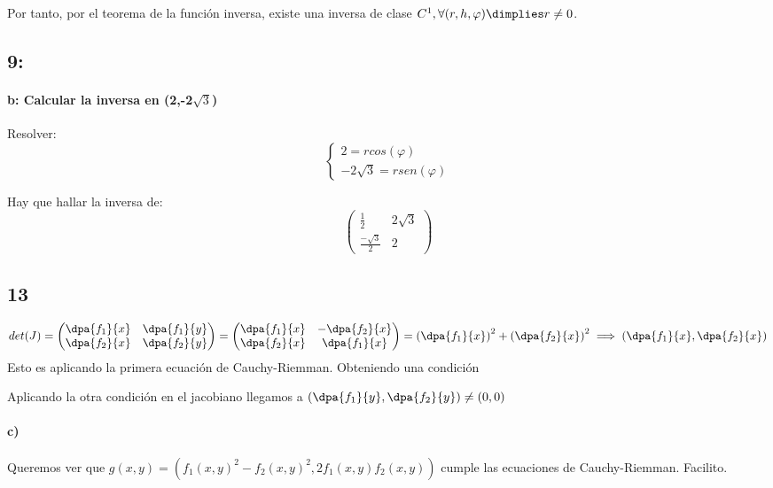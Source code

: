 \documentclass{apuntes}
\begin{document}
      Por tanto, por el teorema de la función inversa, existe una inversa de clase $C^1, \forall (r,h,\varphi) \dimplies r\neq 0$.

 \subsection{9:}
 
 \paragraph{b: Calcular la inversa en (2,-2$\sqrt{3}$)}
 
 Resolver: $$\left\{\begin{matrix} 2 = rcos(\varphi)\\-2\sqrt{3} = rsen(\varphi)\end{matrix}\right.$$
 
 Hay que hallar la inversa de: $$\begin{pmatrix}
                                  \frac{1}{2}&2\sqrt{3}\\
                                  \frac{-\sqrt{3}}{2}&2
                                 \end{pmatrix}$$

                                 
  \subsection{13}
  
  $$det(J) = \begin{pmatrix}
              \dpa{f_1}{x}&\dpa{f_1}{y}\\
              \dpa{f_2}{x}&\dpa{f_2}{y}
             \end{pmatrix} = 
             \begin{pmatrix}
              \dpa{f_1}{x}&-\dpa{f_2}{x}\\
              \dpa{f_2}{x}& \dpa{f_1}{x}
             \end{pmatrix}
	    = \left(\dpa{f_1}{x}\right)^2 + \left(\dpa{f_2}{x}\right)^2 \implies \left(\dpa{f_1}{x},\dpa{f_2}{x}\right)$$
Esto es aplicando la primera ecuación de Cauchy-Riemman. Obteniendo una condición

Aplicando la otra condición en el jacobiano llegamos a $\displaystyle\left(\dpa{f_1}{y},\dpa{f_2}{y}\right)\neq (0,0)$
\paragraph{c)}

Queremos ver que $g(x,y) = (f_1(x,y)^2-f_2(x,y)^2,2f_1(x,y)f_2(x,y))$ cumple las ecuaciones de Cauchy-Riemman. Facilito.
\end{document}
